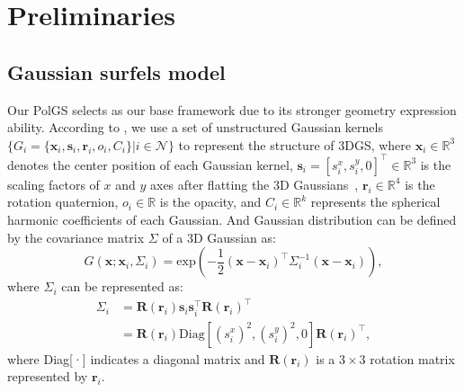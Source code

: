 \section{Preliminaries}
\subsection{Gaussian surfels model}
Our PolGS selects \gs as our base framework due to its stronger geometry expression ability. 
According to \gs, we use a set of unstructured Gaussian kernels $\{G_i=\{\textbf{x}_i,\textbf{s}_i,\textbf{r}_i,o_i,C_i\}|i\in
 \mathcal{N}\}$ to represent the structure of 3DGS, where  $\textbf{x}_i\in\mathbb{R}^3$ denotes the center 
 position of each Gaussian kernel, $\textbf{s}_i=[s^x_i,s^y_i,0]^\top\in\mathbb{R}^3$ is the scaling factors of $x$ and 
 $y$ axes after flatting the 3D Gaussians~\cite{kerbl20233d}, $\textbf{r}_i\in\mathbb{R}^4$ is the rotation quaternion, 
 $o_i\in\mathbb{R}$ is the opacity, and $C_i\in\mathbb{R}^k$ represents the spherical harmonic coefficients of each Gaussian. 
 And Gaussian distribution can be defined by the covariance matrix $\Sigma$ of a 3D Gaussian as:
\begin{equation}
    G(\textbf{x};\textbf{x}_i,\Sigma_i)=\text{exp}(-\frac{1}{2}(\textbf{x}-\textbf{x}_i)^\top\Sigma_i^{-1}(\textbf{x}-\textbf{x}_i)),
\end{equation}
where $\Sigma_i$ can be represented as:
\begin{equation}
\begin{aligned}
	\label{equation:sigma}
    \Sigma_i &= \textbf{R}(\textbf{r}_i)\textbf{s}_i\textbf{s}_i^\top\textbf{R}(\textbf{r}_i)^\top\\
    &= \textbf{R}(\textbf{r}_i)\text{Diag}[(s^x_i)^2,(s^y_i)^2,0]\textbf{R}(\textbf{r}_i)^\top,
\end{aligned}
\end{equation}
where Diag[·] indicates a diagonal matrix and $\textbf{R}(\textbf{r}_i)$ is a $3 \times 3$
rotation matrix represented by $\textbf{r}_i$.
\vspace{-1em}
